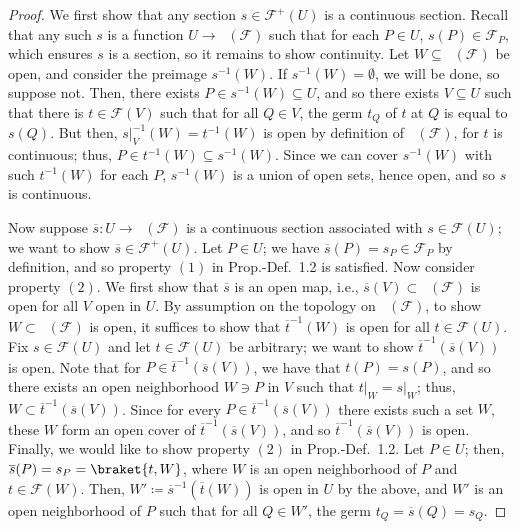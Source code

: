 \documentclass[10pt]{article}
\theoremstyle{definition}
\theoremstyle{remark}
\numberwithin{equation}{section}
\numberwithin{figure}{subsubsection}
\DeclareMathOperator{\Spe}{Sp\acute{e}}
\begin{document}
\begin{proof}
  We first show that any section $s \in \mathscr{F}^+(U)$ is a continuous section. Recall that any such $s$ is a function $U \to \Spe(\mathscr{F})$ such that for each $P \in U$, $s(P) \in \mathscr{F}_P$, which ensures $s$ is a section, so it remains to show continuity. Let $W \subseteq \Spe(\mathscr{F})$ be open, and consider the preimage $s^{-1}(W)$. If $s^{-1}(W) = \emptyset$, we will be done, so suppose not. Then, there exists $P \in s^{-1}(W) \subseteq U$, and so there exists $V \subseteq U$ such that there is $t \in \mathscr{F}(V)$ such that for all $Q \in V$, the germ $t_Q$ of $t$ at $Q$ is equal to $s(Q)$. But then, $s\vert_V^{-1}(W) = t^{-1}(W)$ is open by definition of $\Spe(\mathscr{F})$, for $t$ is continuous; thus, $P \in t^{-1}(W) \subseteq s^{-1}(W)$. Since we can cover $s^{-1}(W)$ with such $t^{-1}(W)$ for each $P$, $s^{-1}(W)$ is a union of open sets, hence open, and so $s$ is continuous.
  \par Now suppose $\overline{s}\colon U \to \Spe(\mathscr{F})$ is a continuous section associated with $s \in \mathscr{F}(U)$; we want to show $\overline{s} \in \mathscr{F}^+(U)$. Let $P \in U$; we have $\overline{s}(P) = s_P \in \mathscr{F}_P$ by definition, and so property $(1)$ in Prop.-Def.~1.2 is satisfied. Now consider property $(2)$. We first show that $\overline{s}$ is an open map, i.e., $\overline{s}(V) \subset \Spe(\mathscr{F})$ is open for all $V$ open in $U$. By assumption on the topology on $\Spe(\mathscr{F})$, to show $W \subset \Spe(\mathscr{F})$ is open, it suffices to show that $\overline{t}^{-1}(W)$ is open for all $t \in \mathscr{F}(U)$. Fix $s \in \mathscr{F}(U)$ and let $t \in \mathscr{F}(U)$ be arbitrary; we want to show $\overline{t}^{-1}(\overline{s}(V))$ is open. Note that for $P \in \overline{t}^{-1}(\overline{s}(V))$, we have that $t(P) = s(P)$, and so there exists an open neighborhood $W \ni P$ in $V$ such that $t\vert_W = s\vert_W$; thus, $W \subset \overline{t}^{-1}(\overline{s}(V))$. Since for every $P \in \overline{t}^{-1}(\overline{s}(V))$ there exists such a set $W$, these $W$ form an open cover of $\overline{t}^{-1}(\overline{s}(V))$, and so $\overline{t}^{-1}(\overline{s}(V))$ is open. Finally, we would like to show property $(2)$ in Prop.-Def.~1.2. Let $P \in U$; then, $\overline{s}(P) = s_P = \braket{t,W}$, where $W$ is an open neighborhood of $P$ and $t \in \mathscr{F}(W)$. Then, $W' \coloneqq \overline{s}^{-1}(\overline{t}(W))$ is open in $U$ by the above, and $W'$ is an open neighborhood of $P$ such that for all $Q \in W'$, the germ $t_Q = \overline{s}(Q) = s_Q$.
\end{proof}
\end{document}
